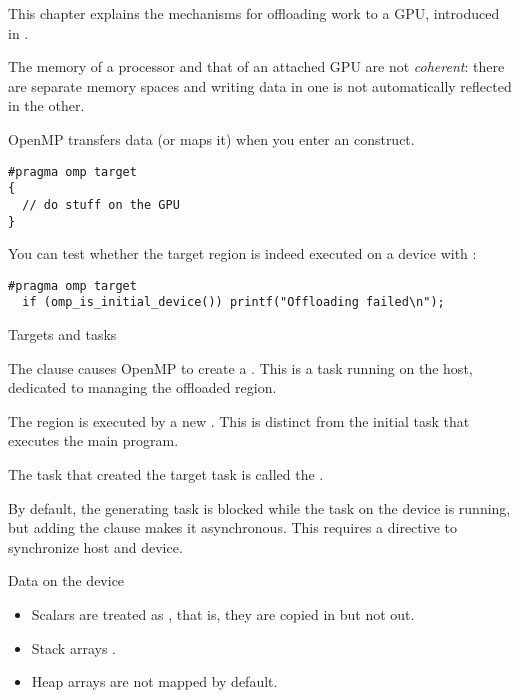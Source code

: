 
This chapter explains the mechanisms for offloading work to a \acf{GPU},
introduced in .

The memory of a processor and that of an attached \ac{GPU} are not
\emph{coherent}:
there are separate memory spaces and writing data in one
is not automatically reflected in the other.

OpenMP transfers data (or maps it) when you enter an 
construct.
\begin{lstlisting}
#pragma omp target
{
  // do stuff on the GPU
}
\end{lstlisting}

You can test whether the target region is indeed executed on a device
with :
\begin{lstlisting}
#pragma omp target
  if (omp_is_initial_device()) printf("Offloading failed\n");
\end{lstlisting}

 {Targets and tasks}

The  clause causes OpenMP to create a
.
This is a task running on the host, dedicated to managing the
offloaded region.

The  region is executed
by a new .
This is distinct from the initial task that executes the main program.

The task that created the target task is called the
.

By default, the generating task is blocked while the task on the device is running,
but adding the  clause makes it asynchronous.
This requires a  directive to synchronize host and device.

 {Data on the device}

\begin{itemize}
\item Scalars are treated as , that is,
  they are copied in but not out.
\item Stack arrays .
\item Heap arrays are not mapped by default.
\end{itemize}


